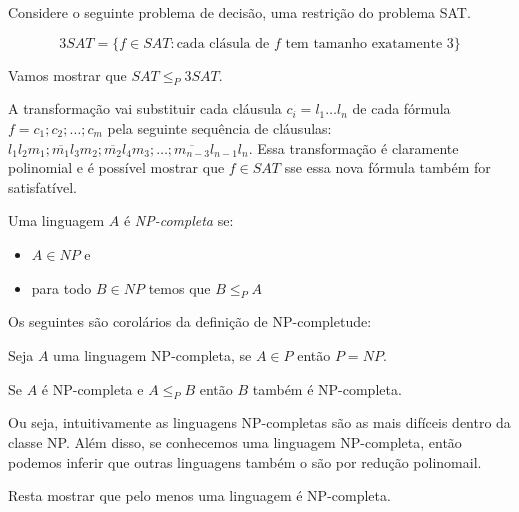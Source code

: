 \begin{example}
  Considere o seguinte problema de decisão, uma restrição do problema SAT.
  
  \begin{displaymath}
    3SAT = \{f \in SAT : \textrm{cada clásula de $f$ tem tamanho exatamente 3}\}
  \end{displaymath}

  Vamos mostrar que $SAT \leq_P 3SAT$.

  A transformação vai substituir cada cláusula $c_i = l_1 \dots l_n$ de cada fórmula $f = c_1;c_2; \dots; c_m$ pela seguinte sequência de cláusulas: $l_1l_2m_1;\overline{m_1}l_3m_2;\overline{m_2}l_4m_3; \dots ; \overline{m_{n-3}}l_{n-1}l_n$.
  Essa transformação é claramente polinomial e é possível mostrar que $f \in SAT$ sse essa nova fórmula também for satisfatível.

\end{example}

Uma linguagem $A$ é {\em NP-completa} se:
\begin{itemize}
\item $A \in NP$ e
\item para todo $B \in NP$ temos que $B \leq_P A$
\end{itemize}

Os seguintes são corolários da definição de NP-completude:

\begin{corollary}
  Seja $A$ uma linguagem NP-completa, se $A \in P$ então $P = NP$.
\end{corollary}

\begin{corollary}
  Se $A$ é NP-completa e $A \leq_P B$ então $B$ também é NP-completa.
\end{corollary}

Ou seja, intuitivamente as linguagens NP-completas são as mais difíceis dentro da classe NP.
Além disso, se conhecemos uma linguagem NP-completa, então podemos inferir que outras linguagens também o são por redução polinomail.

Resta mostrar que pelo menos uma linguagem é NP-completa.

